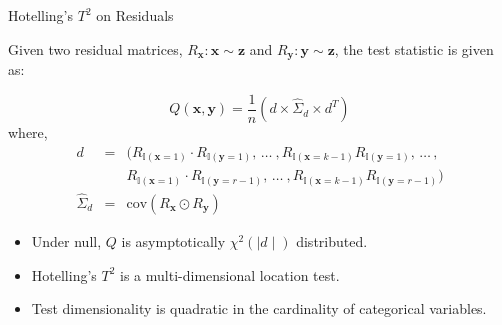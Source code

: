 \documentclass{beamer}
\begin{document}
\begin{frame}{Hotelling's $ T^2 $ on Residuals}

Given two residual matrices, $ R_{\mathbf{x}}: \mathbf{x} \sim \mathbf{z} $ and $ R_{\mathbf{y}}: \mathbf{y} \sim \mathbf{z} $, the test statistic is given as:

\begin{equation}
	Q(\mathbf{x}, \mathbf{y}) = \frac{1}{n} \left( d \times \hat{\Sigma}_d \times d^T \right)
\end{equation}
where,
\begin{eqnarray*}
d &  =  & (R_{\mathbb{I}(\mathbf{x}=1)} \cdot R_{\mathbb{I}(\mathbf{y}=1)}, \, \ldots \ ,
R_{\mathbb{I}(\mathbf{x}=k-1)} R_{\mathbb{I}(\mathbf{y}=1)}, \, \ldots \, ,
\\
 &  & R_{\mathbb{I}(\mathbf{x}=1)} \cdot R_{\mathbb{I}(\mathbf{y}=r-1)}, \, \ldots \ ,
R_{\mathbb{I}(\mathbf{x}=k-1)} R_{\mathbb{I}(\mathbf{y}=r-1)}
) \\
\hat{\Sigma}_d & = &\textrm{cov}(R_\mathbf{x} \odot R_\mathbf{y})
\end{eqnarray*}




\vspace{1em}

\begin{itemize}
	\item Under null, $ Q $ is asymptotically $ \chi^2 (\mid d \mid) $ distributed.
	\item Hotelling's $ T^2 $ is a multi-dimensional location test.
	\item Test dimensionality is quadratic in the cardinality of categorical variables.
\end{itemize}

\end{frame}
\end{document}
